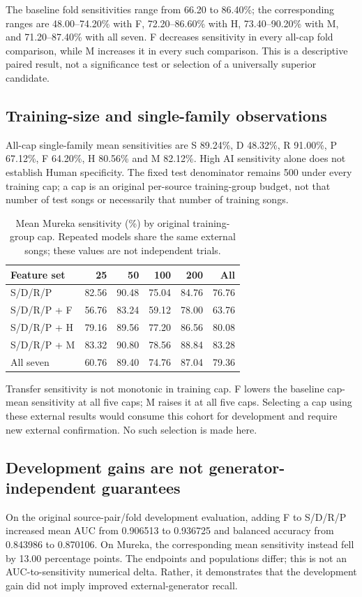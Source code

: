 The baseline fold sensitivities range from 66.20 to 86.40\%; the corresponding
ranges are 48.00--74.20\% with F, 72.20--86.60\% with H, 73.40--90.20\%
with M, and 71.20--87.40\% with all seven. F decreases sensitivity in every
all-cap fold comparison, while M increases it in every such comparison.
This is a descriptive paired result, not a significance test or selection of
a universally superior candidate.

\subsection{Training-size and single-family observations}
All-cap single-family mean sensitivities are S 89.24\%, D 48.32\%, R 91.00\%,
P 67.12\%, F 64.20\%, H 80.56\% and M 82.12\%. High AI sensitivity alone
does not establish Human specificity. The fixed test denominator remains 500
under every training cap; a cap is an original per-source training-group budget,
not that number of test songs or necessarily that number of training songs.

\begin{table}[htbp]
\centering\small
\begin{tabular}{lrrrrr}
\hline
Feature set & 25 & 50 & 100 & 200 & All\\
\hline
S/D/R/P & 82.56 & 90.48 & 75.04 & 84.76 & 76.76\\
S/D/R/P + F & 56.76 & 83.24 & 59.12 & 78.00 & 63.76\\
S/D/R/P + H & 79.16 & 89.56 & 77.20 & 86.56 & 80.08\\
S/D/R/P + M & 83.32 & 90.80 & 78.56 & 88.84 & 83.28\\
All seven & 60.76 & 89.40 & 74.76 & 87.04 & 79.36\\
\hline
\end{tabular}
\caption{Mean Mureka sensitivity (\%) by original training-group cap. Repeated
models share the same external songs; these values are not independent trials.}
\label{tab:mureka-quantity}
\end{table}

Transfer sensitivity is not monotonic in training cap. F lowers the baseline
cap-mean sensitivity at all five caps; M raises it at all five caps. Selecting
a cap using these external results would consume this cohort for development
and require new external confirmation. No such selection is made here.

\subsection{Development gains are not generator-independent guarantees}
On the original source-pair/fold development evaluation, adding F to S/D/R/P
increased mean AUC from 0.906513 to 0.936725 and balanced accuracy from
0.843986 to 0.870106. On Mureka, the corresponding mean sensitivity instead
fell by 13.00 percentage points. The endpoints and populations differ; this
is not an AUC-to-sensitivity numerical delta. Rather, it demonstrates that
the development gain did not imply improved external-generator recall.

